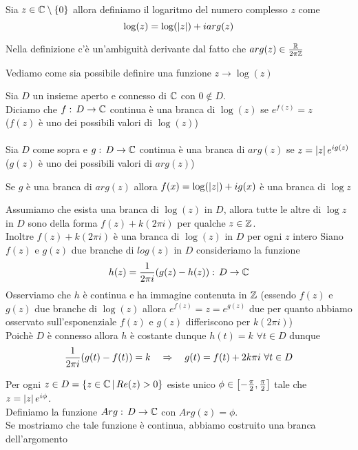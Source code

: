 \newpage
\begin{defn} Sia $z\in \mathbb{C}\setminus \{0 \}$ allora definiamo il logaritmo del numero complesso $z$ come
$$\log(z) = \log(\left\vert z \right\vert ) + i arg(z)$$
\end{defn}
\begin{oss}Nella definizione c'\`e un'ambiguit\`a derivante dal fatto che $arg(z) \in \frac{\mathbb{R}}{2\pi\mathbb{Z}}$
\end{oss}
Vediamo come sia possibile definire una funzione $z\to \log (z)$ 
\begin{defn}[branca]\bianco
Sia $D$ un insieme aperto e connesso di $\mathbb{C}$ con $0\not \in D$.\\
Diciamo che $f:\, D \to \mathbb{C}$ continua \`e una branca di $\log(z)$ se $e^{f(z)}=z$\\
($f(z)$ \`e uno dei possibili valori di $\log(z)$)\\ \\ 
Sia $D$ come sopra  e $g:\, D \to \mathbb{C}$ continua \`e una branca di $arg(z)$ se 
$z=\left\vert z \right\vert e^{i g(z)}$\\
($g(z)$ \`e uno dei possibili valori di $arg(z)$)
\end{defn}
\begin{oss} Se $g$ \`e una branca di $arg(z)$ allora  $f(x)= \log(\left\vert z \right\vert ) + i g(x)$ \`e una branca di $\log z $
\end{oss}
\begin{prop}Assumiamo che esista una branca di $\log(z)$ in $D$, allora tutte le altre di $\log z$ in $D$ sono della forma $f(z)+ k (2\pi i)$ per qualche $z\in \mathbb{Z}$.\\
Inoltre $f(z) + k(2\pi i)$ \`e una branca di $\log(z)$ in $D$ per ogni $z$ intero
\proof Siano $f(z)$ e $g(z)$ due branche di $log(z)$ in $D$ consideriamo la funzione 
$$h(z) = \frac{1}{2\pi i } (g(z)-h(z)) :\, D\to \mathbb{C}$$
Osserviamo che $h$ \`e continua e ha immagine contenuta in $\mathbb{Z}$ (essendo $f(z)$ e $g(z)$ due branche di $\log(z)$ allora $e^{f(z)}=z= e^{g(z)}$ due per quanto abbiamo osservato sull'esponenziale $f(z)$ e $g(z)$ differiscono per $k(2\pi i )$)\\
Poich\`e $D$ \`e connesso allora $h$ \`e costante dunque $h(t)=k \, \, \forall t \in D$ dunque 
$$\frac{1}{2\pi i}(g(t)-f(t))=k \quad \Rightarrow \quad g(t)=f(t) + 2k \pi i \, \, \forall t\in D $$
\end{prop}
\begin{oss}Per ogni $z\in D=\{ z\in \mathbb{C} \, \vert \, Re(z)>0\}$ esiste unico 
$\phi\in \left[  -\frac{\pi}{2},\frac{\pi}{2} \right]$
 tale che $z=\left\vert z \right\vert e^{i \phi}$.\\
Definiamo la funzione $Arg :\, D \to \mathbb{C}$ con $Arg(z)= \phi$.\\
Se mostriamo che tale funzione \`e continua, abbiamo costruito una branca dell'argomento
\end{oss}
